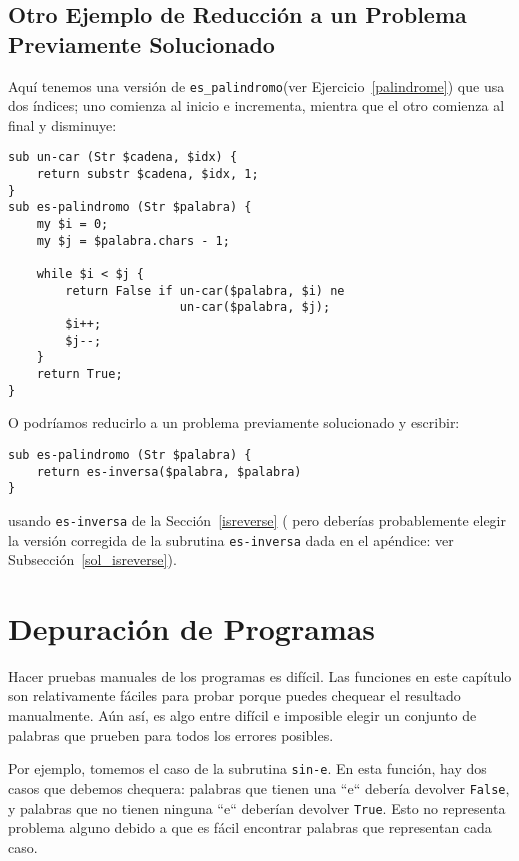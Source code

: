 \subsection{Otro Ejemplo de Reducción a un Problema Previamente Solucionado}

\label{palindrome_2}

Aquí tenemos una versión de \verb|es_palindromo|(ver Ejercicio~\ref{palindrome})
que usa dos índices; uno comienza al inicio e incrementa, mientra que el
otro comienza al final y disminuye:

\begin{verbatim}
sub un-car (Str $cadena, $idx) {
    return substr $cadena, $idx, 1;
}
sub es-palindromo (Str $palabra) {
    my $i = 0;
    my $j = $palabra.chars - 1;

    while $i < $j {
        return False if un-car($palabra, $i) ne 
                        un-car($palabra, $j);
        $i++;
        $j--;
    }
    return True;
}
\end{verbatim}

O podríamos reducirlo a un problema previamente solucionado
y escribir:

\begin{verbatim}
sub es-palindromo (Str $palabra) {
    return es-inversa($palabra, $palabra)
}
\end{verbatim}
%
usando \verb|es-inversa| de la Sección~\ref{isreverse} (
pero deberías probablemente elegir la versión corregida de la
subrutina \verb|es-inversa| dada en el apéndice: 
ver Subsección~\ref{sol_isreverse}).


\section{Depuración de Programas}

Hacer pruebas manuales de los programas es difícil. Las funciones en este
capítulo son relativamente fáciles para probar porque puedes chequear 
el resultado manualmente. Aún así, es algo entre difícil e imposible elegir
un conjunto de palabras que prueben para todos los errores posibles.

Por ejemplo, tomemos el caso de la subrutina \verb|sin-e|. En esta función, hay dos casos
que debemos chequera: palabras que tienen una ``e`` debería devolver {\tt False},
y palabras que no tienen ninguna ``e`` deberían devolver {\tt True}. Esto
no representa problema alguno debido a que es fácil encontrar palabras
que representan cada caso.

